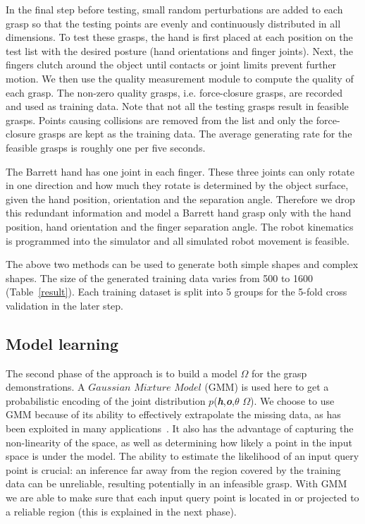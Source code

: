 In the final step before testing, small random perturbations are added to each grasp so that the testing points are evenly and continuously distributed in all dimensions.
To test these grasps, the hand is first placed at each position on the test list with the desired posture (hand orientations and finger joints). Next, the fingers clutch around the object until contacts or joint limits prevent further motion. We then use the quality measurement module to compute the quality of each grasp. The non-zero quality grasps, i.e. force-closure grasps, are recorded and used as training data. Note that not all the testing grasps result in feasible grasps. Points causing collisions are removed from the list and only the force-closure grasps are kept as the training data. The average generating rate for the feasible grasps is roughly one per five seconds.

The Barrett hand has one joint in each finger. These three joints can only rotate in one direction and how much they rotate is determined by the object surface, given the hand position, orientation and the separation angle.
Therefore we drop this redundant information and model a Barrett hand grasp only with the hand position, hand orientation and the finger separation angle. The robot kinematics is programmed into the simulator and all simulated robot movement is feasible.

The above two methods can be used to generate both simple shapes and complex shapes. The size of the generated training data varies from 500 to 1600 (Table~\ref{result}). Each training dataset is split into 5 groups for the 5-fold cross validation in the later step.


\subsection{Model learning}
\label{cha3:sec2:learn}

The second phase of the approach is to build a model $\varOmega$ for the grasp demonstrations.
A $Gaussian$ $Mixture$ $Model$ (GMM) is used here to get a probabilistic encoding of the joint distribution $p$(\textbf{\emph{h}},\textbf{\emph{o}},\textbf{\emph{$\theta$}} \text{\textbar} $\varOmega$).
We choose to use GMM because of its ability to effectively extrapolate the missing data, as has been exploited in many applications~\citep{calinon2007learning,sauser2011iterative}. It also has the advantage of capturing the non-linearity of the space, as well as determining how likely a point in the input space is under the model.
The ability to estimate the likelihood of an input query point is crucial: an inference far away from the region covered by the training data can be unreliable, resulting potentially in an infeasible grasp. With GMM we are able to make sure that each input query point is located in or projected to a reliable region (this is explained in the next phase).

